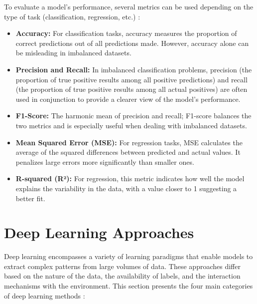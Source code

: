 To evaluate a model’s performance, several metrics can be used depending on the type of task (classification, regression, etc.) \parencite{ketkar2017deep}:
\begin{itemize}
    \item \textbf{Accuracy:} For classification tasks, accuracy measures the proportion of correct predictions out of all predictions made. However, accuracy alone can be misleading in imbalanced datasets.
    \item \textbf{Precision and Recall:} In imbalanced classification problems, precision (the proportion of true positive results among all positive predictions) and recall (the proportion of true positive results among all actual positives) are often used in conjunction to provide a clearer view of the model's performance.
    \item \textbf{F1-Score:} The harmonic mean of precision and recall; F1-score balances the two metrics and is especially useful when dealing with imbalanced datasets.
    \item \textbf{Mean Squared Error (MSE):} For regression tasks, MSE calculates the average of the squared differences between predicted and actual values. It penalizes large errors more significantly than smaller ones.
    \item \textbf{R-squared (R²):} For regression, this metric indicates how well the model explains the variability in the data, with a value closer to 1 suggesting a better fit.
\end{itemize}


\section{Deep Learning Approaches}

Deep learning encompasses a variety of learning paradigms that enable models to extract complex patterns from large volumes of data. These approaches differ based on the nature of the data, the availability of labels, and the interaction mechanisms with the environment. This section presents the four main categories of deep learning methods \parencite{alzubaidi2021review}:

